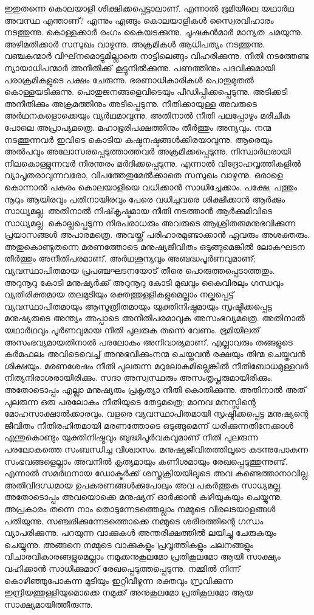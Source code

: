 ഇതുതന്നെ കൊലയാളി ശിക്ഷിക്കപ്പെട്ടാലാണ്. എന്നാല്‍ ഭൂമിയിലെ യഥാര്‍ഥ അവസ്ഥ എന്താണ്? എന്നും എങ്ങും കൊലയാളികള്‍ സ്വൈരവിഹാരം നടത്തുന്നു. കൊള്ളക്കാര്‍ രംഗം കൈയടക്കുന്നു. ചൂഷകന്‍മാര്‍ മാന്യത ചമയുന്നു. അഴിമതിക്കാര്‍ സസുഖം വാഴുന്നു. അക്രമികള്‍ ആധിപത്യം നടത്തുന്നു. വഞ്ചകന്മാര്‍ വിഘ്‌നമൊട്ടുമില്ലാതെ നാട്ടിലെങ്ങും വിഹരിക്കുന്നു. നീതി നടത്തേണ്ട ന്യായാധിപന്മാര്‍ അനീതിക്ക് കൂട്ടുനില്‍ക്കുന്നു. പണത്തിനും പദവിക്കുമായി പരാക്രമികളുടെ പക്ഷം ചേരുന്നു. ഭരണാധികാരികള്‍ പൊതുമുതല്‍ കൊള്ളയടിക്കുന്നു. പൊതുജനങ്ങളെവിടെയും പീഡിപ്പിക്കപ്പെടുന്നു. അടിക്കടി അനീതിക്കും അക്രമത്തിനും അടിപ്പെടുന്നു. നീതിക്കായുള്ള അവരുടെ അര്‍ഥനകളൊക്കെയും വ്യര്‍ഥമാവുന്നു. അതിനാല്‍ നീതി പലപ്പോഴും മരീചിക പോലെ അപ്രാപ്യമത്രെ. മഹാഭൂരിപക്ഷത്തിനും തീര്‍ത്തും അന്യവും.
നന്മ നടത്തുന്നവര്‍ ഇവിടെ കൊടിയ കഷ്ടനഷ്ടങ്ങള്‍ക്കിരയാവുന്നു. ആരെയും അല്‍പവും അലോസരപ്പെടുത്താത്തവര്‍ അക്രമിക്കപ്പെടുന്നു. നിസ്വാര്‍ഥരായി നിലകൊള്ളുന്നവര്‍ നിരന്തരം മര്‍ദിക്കപ്പെടുന്നു. എന്നാല്‍ വിദ്രോഹവൃത്തികളില്‍ വ്യാപൃതരാവുന്നവരോ, വിപത്തേതുമേല്‍ക്കാതെ സസുഖം വാഴുന്നു.
ഒരാളെ കൊന്നാല്‍ പകരം കൊലയാളിയെ വധിക്കാന്‍ സാധിച്ചേക്കാം. പക്ഷേ, പത്തും നൂറും ആയിരവും പതിനായിരവും പേരെ വധിച്ചവരെ ശിക്ഷിക്കാന്‍ ആര്‍ക്കും സാധ്യമല്ല. അതിനാല്‍ നിഷ്‌കൃഷ്ടമായ നീതി നടത്താന്‍ ആര്‍ക്കുമിവിടെ സാധ്യമല്ല. കൊല്ലപ്പെടുന്ന നിരപരാധരും അവരുടെ ആശ്രിതരുമനുഭവിക്കുന്ന പ്രയാസങ്ങള്‍ അപാരമത്രെ. അവയ്ക്ക് പരിഹാരമുണ്ടാക്കാന്‍ ഏവരും അശക്തരും. അതുകൊണ്ടുതന്നെ മരണത്തോടെ മനുഷ്യജീവിതം ഒടുങ്ങുമെങ്കില്‍ ലോകഘടന തീര്‍ത്തും അനീതിപരമാണ്. അര്‍ഥശൂന്യവും അബദ്ധപൂര്‍ണവുമാണ്; വ്യവസ്ഥാപിതമായ പ്രപഞ്ചഘടനയോട് തീരെ പൊരുത്തപ്പെടാത്തതും. അറുനൂറു കോടി മനുഷ്യര്‍ക്ക് അറുനൂറു കോടി മുഖവും കൈവിരലും ഗന്ധവും വ്യതിരിക്തമായ തലമുടിയും രക്തത്തുള്ളികളുമെല്ലാം നല്കപ്പെട്ട് വ്യവസ്ഥാപിതമായും ആസൂത്രിതമായും യുക്തിനിഷ്ഠമായും സൃഷ്ടിക്കപ്പെട്ട മനുഷ്യരുടെ അന്ത്യം അപ്പാടെ അനീതിപരമാവുക അസംഭവ്യമത്രെ. അതിനാല്‍ യഥാര്‍ഥവും പൂര്‍ണവുമായ നീതി പുലരുക തന്നെ വേണം. ഭൂമിയിലത് അസംഭവ്യമായതിനാല്‍ പരലോകം അനിവാര്യമാണ്. എല്ലാവരും തങ്ങളുടെ കര്‍മഫലം അവിടെവെച്ച് അനുഭവിക്കുംനന്മ ചെയ്തവന്‍ രക്ഷയും തിന്മ ചെയ്തവന്‍ ശിക്ഷയും.
മരണശേഷം നീതി പുലരുന്ന മറുലോകമില്ലെങ്കില്‍ നീതിബോധമുള്ളവര്‍ നിത്യനിരാശരായിരിക്കും. സദാ അസ്വസ്ഥരും അസംതൃപ്തരുമായിരിക്കും. അതോടൊപ്പം എല്ലാ മനുഷ്യരും പ്രകൃത്യാ നീതി കൊതിക്കുന്നു. അതിനാല്‍ അത് പുലരുന്ന ഒരു പരലോകം നീതിയുടെ തേട്ടമത്രെ; മാനവ മനസ്സിന്റെ മോഹസാക്ഷാല്‍ക്കാരവും. വളരെ വ്യവസ്ഥാപിതമായി സൃഷ്ടിക്കപ്പെട്ട മനുഷ്യന്റെ ജീവിതം നീതിരഹിതമായി മരണത്തോടെ ഒടുങ്ങുമെന്ന് ധരിക്കുന്നതിനേക്കാള്‍ എന്തുകൊണ്ടും യുക്തിനിഷ്ഠവും ബുദ്ധിപൂര്‍വകവുമാണ് നീതി പുലരുന്ന പരലോകത്തെ സംബന്ധിച്ച വിശ്വാസം.
മനുഷ്യജീവിതത്തിലൂടെ കടന്നുപോകുന്ന സംഭവങ്ങളെല്ലാം അവനില്‍ കൃത്യമായും കണിശമായും രേഖപ്പെടുത്തുന്നുണ്ട്. എന്നാല്‍ സമര്‍ഥനായ ഡോക്ടര്‍ക്ക് ശസ്ത്രക്രിയയിലൂടെ അവ കണ്ടെത്താനാവില്ല. അതിവിദഗ്ധമായ ഉപകരണങ്ങള്‍ക്കുപോലും അവ പകര്‍ത്തുക സാധ്യമല്ല. അതോടൊപ്പം അവയൊക്കെ മനുഷ്യന് ഓര്‍ക്കാന്‍ കഴിയുകയും ചെയ്യുന്നു. അപ്രകാരം തന്നെ നാം തൊടുന്നേടത്തെല്ലാം നമ്മുടെ വിരലടയാളങ്ങള്‍ പതിയുന്നു. സഞ്ചരിക്കുന്നേടത്തൊക്കെ നമ്മുടെ ശരീരത്തിന്റെ ഗന്ധം വ്യാപരിക്കുന്നു. പറയുന്ന വാക്കുകള്‍ അന്തരീക്ഷത്തില്‍ ലയിച്ചു ചേരുകയും ചെയ്യുന്നു. അങ്ങനെ നമ്മുടെ വാക്കുകളും പ്രവൃത്തികളും ചലനങ്ങളും വിചാരവികാരങ്ങളുമെല്ലാം നമുക്കനുകൂലമോ പ്രതികൂലമോ ആയി സാക്ഷ്യം വഹിക്കാന്‍ സാധിക്കുമാറ് രേഖപ്പെടുത്തപ്പെടുന്നു. നമ്മില്‍ നിന്ന് കൊഴിഞ്ഞുപോകുന്ന മുടിയും ഇറ്റിവീഴുന്ന രക്തവും സ്രവിക്കുന്ന ഇന്ദ്രിയത്തുള്ളിയുമൊക്കെ നമുക്ക് അനുകൂലമോ പ്രതികൂലമോ ആയ സാക്ഷ്യമായിത്തീരുന്നു.
